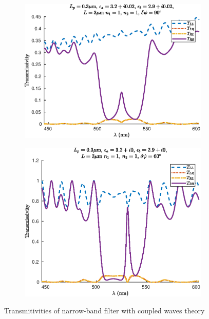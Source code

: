 \begin{figure}
\begin{subfigure}{0.49\linewidth}
		\includegraphics[width=\linewidth]{plots/defect/reflectivity_losses/cwt_transmission}
		\caption{}
	\end{subfigure}
	\begin{subfigure}{0.49\linewidth}
		\includegraphics[width=\linewidth]{plots/defect/reflectivity_other_defect/cwt_transmission}
		\caption{}
	\end{subfigure}
	\caption[Transmitivities of the narrow-band filter]{Transmitivities of narrow-band filter with coupled waves theory}
	\label{fig:transitivities_narrow_appendix}
\end{figure}


